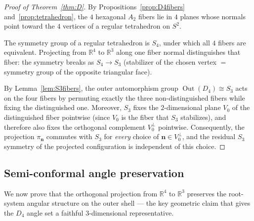 \documentclass[11pt,reqno]{amsart}
\theoremstyle{plain}
\theoremstyle{definition}
\theoremstyle{remark}
\newcommand{\R}{\mathbb{R}}
\DeclareMathOperator{\Out}{Out}
\begin{document}
\begin{proof}[Proof of Theorem~\ref{thm:D}]
By Propositions~\ref{prop:D4fibers} and~\ref{prop:tetrahedron},
the $4$ hexagonal $A_2$ fibers lie in $4$ planes whose normals
point toward the $4$ vertices of a regular tetrahedron on $S^2$.

The symmetry group of a regular tetrahedron is $S_4$,
under which all $4$ fibers are equivalent.
Projecting from $\R^4$ to $\R^3$ along one fiber normal
distinguishes that fiber: the symmetry breaks as
$S_4 \to S_3$ (stabilizer of the chosen vertex $=$ symmetry
group of the opposite triangular face).

By Lemma~\ref{lem:S3fibers}, the outer automorphism group
$\Out(D_4) \cong S_3$ acts on the four fibers by permuting
exactly the three non-distinguished fibers while fixing the
distinguished one.
Moreover, $S_3$ fixes the $2$-dimensional plane $V_0$ of the
distinguished fiber pointwise (since $V_0$ is the fiber that
$S_3$ stabilizes), and therefore also fixes the orthogonal
complement $V_0^\perp$ pointwise.
Consequently, the projection $\pi_{\mathbf{n}}$ commutes
with $S_3$ for \emph{every} choice of
$\mathbf{n} \in V_0^\perp$, and the residual $S_3$
symmetry of the projected configuration is independent
of this choice.
\end{proof}

\subsection{Semi-conformal angle preservation}
\label{sec:conformal}

We now prove that the orthogonal projection from $\R^4$ to
$\R^3$ preserves the root-system angular structure on the
outer shell --- the key geometric claim that gives the
$D_4$ angle set a faithful $3$-dimensional representative.
\end{document}
